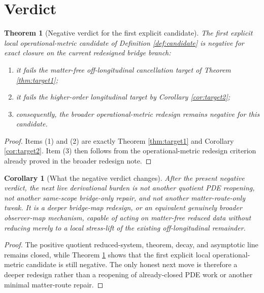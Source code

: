 \documentclass[11pt]{article}
\newtheorem{corollary}{Corollary}
\newtheorem{theorem}{Theorem}
\begin{document}
\section{Verdict}

\begin{theorem}[Negative verdict for the first explicit candidate]
\label{thm:verdict}
The first explicit local operational-metric candidate of Definition \ref{def:candidate} is negative for exact closure on the current redesigned bridge branch:
\begin{enumerate}
    \item it fails the matter-free off-longitudinal cancellation target of Theorem \ref{thm:target1};
    \item it fails the higher-order longitudinal target by Corollary \ref{cor:target2};
    \item consequently, the broader operational-metric redesign remains negative for this candidate.
\end{enumerate}
\end{theorem}

\begin{proof}
Items (1) and (2) are exactly Theorem \ref{thm:target1} and Corollary \ref{cor:target2}. Item (3) then follows from the operational-metric redesign criterion already proved in the broader redesign note.
\end{proof}

\begin{corollary}[What the negative verdict changes]
\label{cor:next}
After the present negative verdict, the next live derivational burden is not another quotient PDE reopening, not another same-scope bridge-only repair, and not another matter-route-only tweak. It is a deeper bridge-map redesign, or an equivalent genuinely broader observer-map mechanism, capable of acting on matter-free reduced data without reducing merely to a local stress-lift of the existing off-longitudinal remainder.
\end{corollary}

\begin{proof}
The positive quotient reduced-system, theorem, decay, and asymptotic line remains closed, while Theorem \ref{thm:verdict} shows that the first explicit local operational-metric candidate is still negative. The only honest next move is therefore a deeper redesign rather than a reopening of already-closed PDE work or another minimal matter-route repair.
\end{proof}
\end{document}

